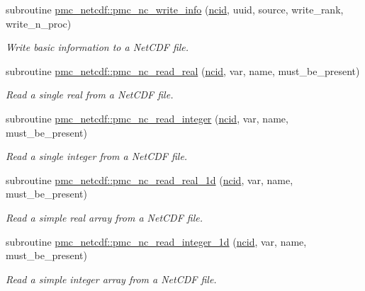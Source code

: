 \begin{DoxyCompactItemize}
subroutine \mbox{\hyperlink{namespacepmc__netcdf_a252de5ecdfc83bdde7492cd9800723df}{pmc\+\_\+netcdf\+::pmc\+\_\+nc\+\_\+write\+\_\+info}} (\mbox{\hyperlink{fractal_8_f90_a4e89f3f850921ff84a6dfce8b166ad50}{ncid}}, uuid, source, write\+\_\+rank, write\+\_\+n\+\_\+proc)
\begin{DoxyCompactList}\small\item\em Write basic information to a Net\+C\+DF file. \end{DoxyCompactList}\item 
subroutine \mbox{\hyperlink{namespacepmc__netcdf_ae8b035a6a051f796e82393d51c2739ff}{pmc\+\_\+netcdf\+::pmc\+\_\+nc\+\_\+read\+\_\+real}} (\mbox{\hyperlink{fractal_8_f90_a4e89f3f850921ff84a6dfce8b166ad50}{ncid}}, var, name, must\+\_\+be\+\_\+present)
\begin{DoxyCompactList}\small\item\em Read a single real from a Net\+C\+DF file. \end{DoxyCompactList}\item 
subroutine \mbox{\hyperlink{namespacepmc__netcdf_acdc3a760526d3131efd57ddaff34904d}{pmc\+\_\+netcdf\+::pmc\+\_\+nc\+\_\+read\+\_\+integer}} (\mbox{\hyperlink{fractal_8_f90_a4e89f3f850921ff84a6dfce8b166ad50}{ncid}}, var, name, must\+\_\+be\+\_\+present)
\begin{DoxyCompactList}\small\item\em Read a single integer from a Net\+C\+DF file. \end{DoxyCompactList}\item 
subroutine \mbox{\hyperlink{namespacepmc__netcdf_af964e1e3180f125f1529aa83f4f9fdef}{pmc\+\_\+netcdf\+::pmc\+\_\+nc\+\_\+read\+\_\+real\+\_\+1d}} (\mbox{\hyperlink{fractal_8_f90_a4e89f3f850921ff84a6dfce8b166ad50}{ncid}}, var, name, must\+\_\+be\+\_\+present)
\begin{DoxyCompactList}\small\item\em Read a simple real array from a Net\+C\+DF file. \end{DoxyCompactList}\item 
subroutine \mbox{\hyperlink{namespacepmc__netcdf_a163630aa93ceda585435019762b4e2e0}{pmc\+\_\+netcdf\+::pmc\+\_\+nc\+\_\+read\+\_\+integer\+\_\+1d}} (\mbox{\hyperlink{fractal_8_f90_a4e89f3f850921ff84a6dfce8b166ad50}{ncid}}, var, name, must\+\_\+be\+\_\+present)
\begin{DoxyCompactList}\small\item\em Read a simple integer array from a Net\+C\+DF file. \end{DoxyCompactList}\item 

\end{DoxyCompactItemize}
